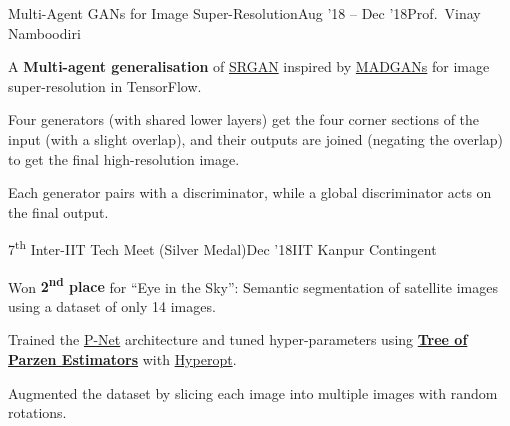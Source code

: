 \begin{itemize}
{    \item \begin{project}{Multi-Agent GANs for Image Super-Resolution}{Aug '18 -- Dec '18}{Prof.\ Vinay Namboodiri}%
        \item A \textbf{Multi-agent generalisation} of \href{https://arxiv.org/abs/1609.04802}{SRGAN} inspired by \href{http://openaccess.thecvf.com/content_cvpr_2018/papers_backup/Ghosh_Multi-Agent_Diverse_Generative_CVPR_2018_paper.pdf}{MADGANs} for image super-resolution in TensorFlow.
        \item Four generators (with shared lower layers) get the four corner sections of the input (with a slight overlap), and their outputs are joined (negating the overlap) to get the final high-resolution image.
        \item Each generator pairs with a discriminator, while a global discriminator acts on the final output.
    \end{project}

    \item \begin{project}{7\textsuperscript{th} Inter-IIT Tech Meet (Silver Medal)}{Dec '18}{IIT Kanpur Contingent}
        \item Won \textbf{2\textsuperscript{nd} place} for ``Eye in the Sky'': Semantic segmentation of satellite images using a dataset of only 14 images.
        \item Trained the \href{http://discovery.ucl.ac.uk/10032237/7/David_08270673.pdf}{P-Net} architecture and tuned hyper-parameters using \href{https://papers.nips.cc/paper/4443-algorithms-for-hyper-parameter-optimization}{\textbf{Tree of Parzen Estimators}} with \href{https://hyperopt.github.io/hyperopt/}{Hyperopt}.
        \item Augmented the dataset by slicing each image into multiple images with random rotations.
    \end{project}
}

\item {}%
\item {}%

\end{itemize}
